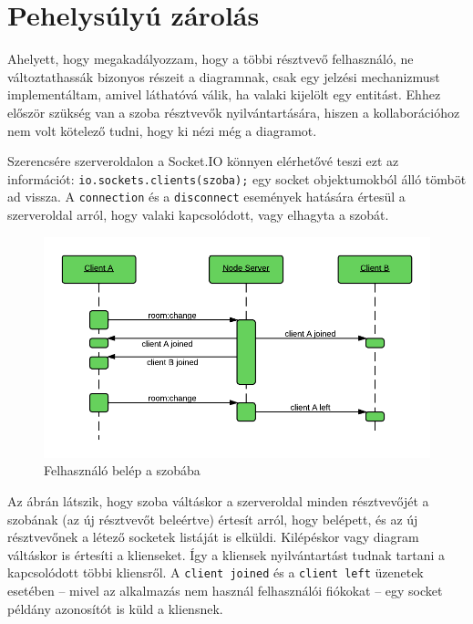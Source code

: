 
\section{Pehelysúlyú zárolás}

Ahelyett, hogy megakadályozzam, hogy a többi résztvevő felhasználó, ne változtathassák bizonyos részeit a diagramnak, csak egy jelzési mechanizmust implementáltam, amivel láthatóvá válik, ha valaki kijelölt egy entitást. Ehhez először szükség van a szoba résztvevők nyilvántartására, hiszen a kollaborációhoz nem volt kötelező tudni, hogy ki nézi még a diagramot.

Szerencsére szerveroldalon a Socket.IO könnyen elérhetővé teszi ezt az információt: \lstinline{io.sockets.clients(szoba);} egy socket objektumokból álló tömböt ad vissza. A \lstinline{connection} és a \lstinline{disconnect} események hatására értesül a szerveroldal arról, hogy valaki kapcsolódott, vagy elhagyta a szobát.

\begin{figure}[!ht]
\centering
\includegraphics[width=15cm,keepaspectratio]{figures/join-seq.png}
\caption{Felhasználó belép a szobába}
\label{fig:joinseq}
\end{figure}

Az ábrán látszik, hogy szoba váltáskor a szerveroldal minden résztvevőjét a szobának (az új résztvevőt beleértve) értesít arról, hogy belépett, és az új résztvevőnek a létező socketek listáját is elküldi. Kilépéskor vagy diagram váltáskor is értesíti a klienseket. Így a kliensek nyilvántartást tudnak tartani a kapcsolódott többi kliensről. A \lstinline{client joined} és a \lstinline{client left} üzenetek esetében -- mivel az alkalmazás nem használ felhasználói fiókokat -- egy socket példány azonosítót is küld a kliensnek.


